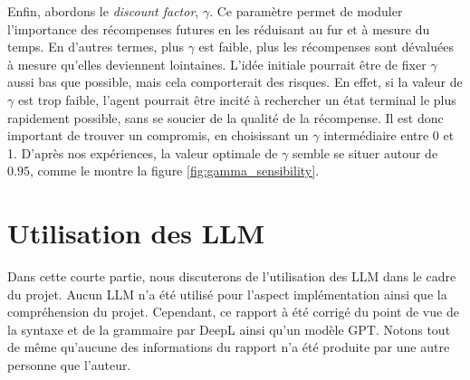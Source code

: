 \documentclass{article}
\begin{document}
\noindent Enfin, abordons le \textit{discount factor}, $\gamma$. Ce paramètre permet de moduler l'importance des récompenses futures en les réduisant au fur et à mesure du temps. En d'autres termes, plus $\gamma$ est faible, plus les récompenses sont dévaluées à mesure qu'elles deviennent lointaines. L'idée initiale pourrait être de fixer $\gamma$ aussi bas que possible, mais cela comporterait des risques. En effet, si la valeur de $\gamma$ est trop faible, l'agent pourrait être incité à rechercher un état terminal le plus rapidement possible, sans se soucier de la qualité de la récompense. Il est donc important de trouver un compromis, en choisissant un $\gamma$ intermédiaire entre 0 et 1. D'après nos expériences, la valeur optimale de $\gamma$ semble se situer autour de $0.95$, comme le montre la figure \ref{fig:gamma_sensibility}.

\section{Utilisation des LLM}

\noindent Dans cette courte partie, nous discuterons de l'utilisation des LLM dans le cadre du projet. Aucun LLM n'a été utilisé pour l'aspect implémentation ainsi que la compréhension du projet. Cependant, ce rapport à été corrigé du point de vue de la syntaxe et de la grammaire par DeepL ainsi qu'un modèle GPT. Notons tout de même qu'aucune des informations du rapport n'a été produite par une autre personne que l'auteur.
\end{document}
